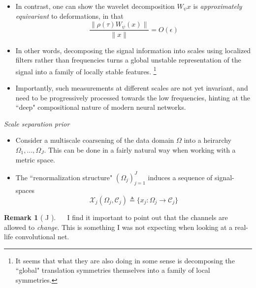 \documentclass[12pt]{article}
\numberwithin{equation}{section}
\theoremstyle{definition}
\newtheorem{rmk}[thm]{Remark}
\newcommand{		\n		}	{	\noindent					} %
\newcommand{		\1		}	{	\bm{1}					}%
\begin{document}
\begin{itemize}
\item In contrast, one can show the wavelet decomposition $W_\psi x$ is \emph{approximately equivariant} to deformations, in that
    $$
    \frac{ \| \rho(\tau) W_{\psi}(x) \| }{ \| x\| } = O(\epsilon) 
    $$
    
\item In other words, decomposing the signal information into scales using localized filters rather than frequencies turns a global unstable representation of the signal into a family of locally stable features. \footnote{It seems that what they are also doing in some sense is decomposing the ``global" translation symmetries themselves into a family of local symmetries. }

\item Importantly, such measurements at different scales are not yet invariant, and need to be progressively processed towards the low frequencies, hinting at the ``deep" compositional nature of modern neural networks.

\end{itemize}

\n\hrulefill 
\emph{ Scale separation prior }
\hrulefill

\begin{itemize}

\item Consider a multiscale coarsening of the data domain $\Omega$ into a heirarchy $\Omega_1, \dots, \Omega_J$. This can be done in a fairly natural way when working with a metric space.

\item The ``renormalization structure" $( \Omega_j )_{j =1}^J$ induces a sequence of signal-spaces
    $$
    \mathcal{X}_j ( \Omega_j, \mathcal{C}_j ) \triangleq \{ x_j : \Omega_j \to \mathcal{C}_j \}
    $$
    
\end{itemize}
    
\n\hrulefill

\begin{rmk}[ J ] $\quad$ I find it important to point out that the channels are allowed to \emph{change}. This is something I was not expecting when looking at a real-life convolutional net. 
\end{rmk}

\n\hrulefill
\end{document}
